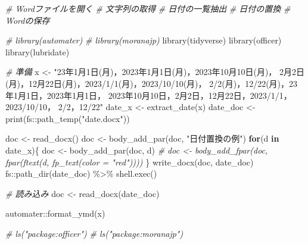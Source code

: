 \documentclass[
]{article}
\newenvironment{Shaded}{\begin{snugshade}}{\end{snugshade}}
\newcommand{\CommentTok}[1]{\textcolor[rgb]{0.56,0.35,0.01}{\textit{#1}}}
\newcommand{\ControlFlowTok}[1]{\textcolor[rgb]{0.13,0.29,0.53}{\textbf{#1}}}
\newcommand{\FunctionTok}[1]{\textcolor[rgb]{0.00,0.00,0.00}{#1}}
\newcommand{\NormalTok}[1]{#1}
\newcommand{\OtherTok}[1]{\textcolor[rgb]{0.56,0.35,0.01}{#1}}
\newcommand{\SpecialCharTok}[1]{\textcolor[rgb]{0.00,0.00,0.00}{#1}}
\newcommand{\StringTok}[1]{\textcolor[rgb]{0.31,0.60,0.02}{#1}}
\begin{document}
\begin{Shaded}
\begin{Highlighting}[]
  \CommentTok{\# Wordファイルを開く}
  \CommentTok{\# 文字列の取得}
  \CommentTok{\# 日付の一覧抽出}
  \CommentTok{\# 日付の置換}
  \CommentTok{\# Wordの保存}

  \CommentTok{\# library(automater)}
  \CommentTok{\# library(moranajp)}
\FunctionTok{library}\NormalTok{(tidyverse)}
\FunctionTok{library}\NormalTok{(officer)}
\FunctionTok{library}\NormalTok{(lubridate)}

  \CommentTok{\# 準備}
\NormalTok{x }\OtherTok{\textless{}{-}} 
  \StringTok{"23年1月1日(月)，2023年1月1日(月)，2023年10月10日(月)，}
\StringTok{  2月2日(月)，12月22日(月)，2023/1/1(月)，2023/10/10(月)，}
\StringTok{  2/2(月)，12/22(月)，23年1月1日，2023年1月1日，}
\StringTok{  2023年10月10日，2月2日，12月22日，2023/1/1，2023/10/10，}
\StringTok{  2/2，12/22"}
\NormalTok{date\_x }\OtherTok{\textless{}{-}} \FunctionTok{extract\_date}\NormalTok{(x)}
\NormalTok{date\_doc }\OtherTok{\textless{}{-}} \FunctionTok{print}\NormalTok{(fs}\SpecialCharTok{::}\FunctionTok{path\_temp}\NormalTok{(}\StringTok{"date.docx"}\NormalTok{))}

\NormalTok{doc }\OtherTok{\textless{}{-}} \FunctionTok{read\_docx}\NormalTok{()}
\NormalTok{doc }\OtherTok{\textless{}{-}} \FunctionTok{body\_add\_par}\NormalTok{(doc, }\StringTok{"日付置換の例"}\NormalTok{)}
\ControlFlowTok{for}\NormalTok{(d }\ControlFlowTok{in}\NormalTok{ date\_x)\{}
\NormalTok{  doc }\OtherTok{\textless{}{-}} \FunctionTok{body\_add\_par}\NormalTok{(doc, d)}
  \CommentTok{\#   doc \textless{}{-} body\_add\_fpar(doc, fpar(ftext(d, fp\_text(color = "red"))))}
\NormalTok{\}}
\FunctionTok{write\_docx}\NormalTok{(doc, date\_doc)}
\NormalTok{fs}\SpecialCharTok{::}\FunctionTok{path\_dir}\NormalTok{(date\_doc) }\SpecialCharTok{\%\textgreater{}\%}
  \FunctionTok{shell.exec}\NormalTok{()}

  \CommentTok{\# 読み込み}
\NormalTok{doc }\OtherTok{\textless{}{-}} \FunctionTok{read\_docx}\NormalTok{(date\_doc)}


\NormalTok{automater}\SpecialCharTok{::}\FunctionTok{format\_ymd}\NormalTok{(x)}

  \CommentTok{\# ls("package:officer")}
  \CommentTok{\# ls("package:moranajp")}
\end{Highlighting}
\end{Shaded}
\end{document}
